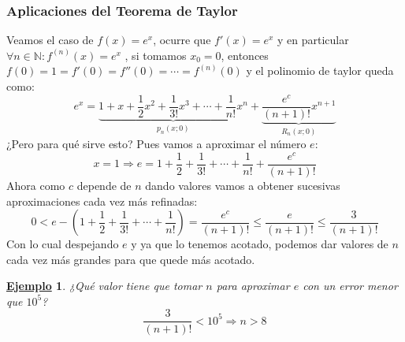 \documentclass[10pt,a4paper,openright]{book}
\theoremstyle{break}
\newtheorem{ej}{\underline{Ejemplo}}[chapter]
\begin{document}
\subsubsection{Aplicaciones del Teorema de Taylor}
Veamos el caso de $f(x)=e^x$, ocurre que $f'(x)=e^x$ y en particular $\forall n\in \mathbb N : f^{(n)}(x)=e^x$ , si tomamos $x_0=0$, entonces $f(0)=1=f'(0)=f''(0)=\cdots = f^{(n)}(0)$ y el polinomio de taylor queda como:
$$e^x=\underbrace{1+x+\frac{1}{2}x^2+\frac{1}{3!}x^3+\cdots + \frac{1}{n!}x^n}_{p_n(x;0)}+\underbrace{\frac{e^c}{(n+1)!}x^{n+1}}_{R_n(x;0)}$$
¿Pero para qué sirve esto? Pues vamos a aproximar el número $e$:
$$x=1\Rightarrow e=1+\frac{1}{2}+\frac{1}{3!}+\cdots + \frac{1}{n!}+\frac{e^c}{(n+1)!}$$
Ahora como $c$ depende de $n$ dando valores vamos a obtener sucesivas aproximaciones cada vez más refinadas:
$$0< e-(1+\frac{1}{2}+\frac{1}{3!}+\cdots + \frac{1}{n!})=\frac{e^c}{(n+1)!}\leq \frac{e}{(n+1)!}\leq \frac{3}{(n+1)!}$$
Con lo cual despejando $e$ y ya que lo tenemos acotado, podemos dar valores de $n$ cada vez más grandes para que quede más acotado.

\begin{ej}
¿Qué valor tiene que tomar $n$ para aproximar $e$ con un error menor que $10^5$?
$$\frac{3}{(n+1)!}<10^5\Rightarrow n>8$$
\end{ej}
\end{document}
